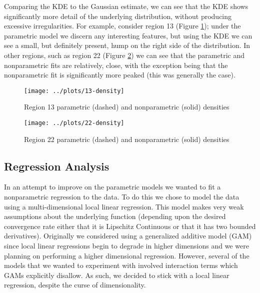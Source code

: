 \documentclass[12pt]{article}
\begin{document}
Comparing the KDE to the Gaussian estimate, we can see that the KDE shows significantly more detail of the underlying distribution, without producing excessive irregularities. For example, consider region 13 (Figure \ref{region13density}); under the parametric model we discern any interesting features, but using the KDE we can see a small, but definitely present, hump on the right side of the distribution. In other regions, such as region 22 (Figure \ref{region22density}) we can see that the parametric and nonparametric fits are relatively, close, with the exception being that the nonparametric fit is significantly more peaked (this was generally the case).
\begin{figure}[!ht]
\centering
\texttt{[image: ../plots/13-density]}
\caption{Region 13 parametric (dashed) and nonparametric (solid) densities}
\label{region13density}
\end{figure}
\begin{figure}[!ht]
\centering
\texttt{[image: ../plots/22-density]}
\caption{Region 22 parametric (dashed) and nonparametric (solid) densities}
\label{region22density}
\end{figure}
\subsection{Regression Analysis}
In an attempt to improve on the parametric models we wanted to fit a nonparametric regression to the data. To do this we chose to model the data using a multi-dimensional local linear regression. This model makes very weak assumptions about the underlying function (depending upon the desired convergence rate either that it is Lipschitz Continuous or that it has two bounded derivatives). Originally we considered using a generalized additive model (GAM) since local linear regressions begin to degrade in higher dimensions and we were planning on performing a higher dimensional regression. However, several of the models that we wanted to experiment with involved interaction terms which GAMs explicitly disallow. As such, we decided to stick with a local linear regression, despite the curse of dimensionality.
\end{document}
